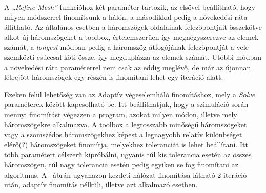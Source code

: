A \textit{„Refine Mesh”} funkcióhoz két paraméter tartozik, az elsővel beállítható, hogy milyen módszerrel finomítsunk a hálón, a másodikkal pedig a növekedési ráta állítható. Az általános esetben a háromszögek oldalainak felezőpontjait összekötve alkot új háromszögeket a toolbox, értelemszerűen így megnégyszerezve az elemek számát, a \textit{longest} módban pedig a háromszög átfogójának felezőpontját a vele szemközti csúccsal köti össze, így megduplázza az elemek számát. Utóbbi módban a növekedési ráta paraméterrel nem csak az eddig meglévő, de már az újonnan létrejött háromszögek egy részén is finomítani lehet egy iteráció alatt.

Ezeken felül lehetőség van az Adaptív végeselemháló finomításhoz, mely a \textit{Solve} paraméterek között kapcsolható be. Itt beállíthatjuk, hogy a szimuláció során mennyi finomítást végezzen a program, azokat milyen módon, illetve mely háromszögekre alkalmazva. A toolbox a legrosszabb minőségű háromszögeket vagy a szomszédos háromszögekhez képest a legnagyobb relatív különbséget elérő(?) háromszögeket finomítja, melyekhez toleranciát is lehet beállítani. Itt több paramétert célszerű kipróbálni, ugyanis túl kis tolerancia esetén az összes háromszögen, túl nagy tolerancia esetén pedig egyiken se fog finomítani az algoritmus. A ~ábrán ugyanazon kezdeti hálózat finomítása látható 2 iteráció után, adaptív finomítás nélküli, illetve azt alkalmazó esetben.


